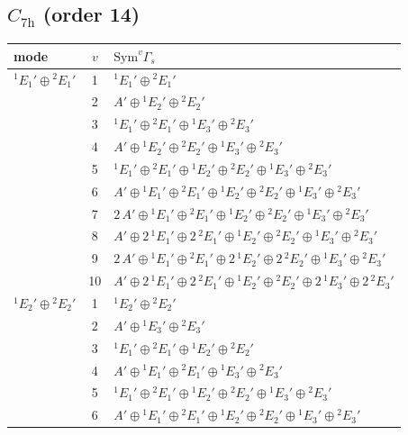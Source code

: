 \documentclass[11pt]{article}
\begin{document}
\subsection*{$C_{7\mathrm{h}}$ \quad (order 14)}
\begin{longtable}{l c p{}}
\hline mode & $v$ & $\mathrm{Sym}^v\Gamma_s$\\ \hline\endhead
${}^{1}E_{1}'\oplus {}^{2}E_{1}'$ & 1 & ${}^{1}E_{1}'\oplus {}^{2}E_{1}'$\\
 & 2 & $A'\oplus {}^{1}E_{2}'\oplus {}^{2}E_{2}'$\\
 & 3 & ${}^{1}E_{1}'\oplus {}^{2}E_{1}'\oplus {}^{1}E_{3}'\oplus {}^{2}E_{3}'$\\
 & 4 & $A'\oplus {}^{1}E_{2}'\oplus {}^{2}E_{2}'\oplus {}^{1}E_{3}'\oplus {}^{2}E_{3}'$\\
 & 5 & ${}^{1}E_{1}'\oplus {}^{2}E_{1}'\oplus {}^{1}E_{2}'\oplus {}^{2}E_{2}'\oplus {}^{1}E_{3}'\oplus {}^{2}E_{3}'$\\
 & 6 & $A'\oplus {}^{1}E_{1}'\oplus {}^{2}E_{1}'\oplus {}^{1}E_{2}'\oplus {}^{2}E_{2}'\oplus {}^{1}E_{3}'\oplus {}^{2}E_{3}'$\\
 & 7 & $2\,A'\oplus {}^{1}E_{1}'\oplus {}^{2}E_{1}'\oplus {}^{1}E_{2}'\oplus {}^{2}E_{2}'\oplus {}^{1}E_{3}'\oplus {}^{2}E_{3}'$\\
 & 8 & $A'\oplus 2\,{}^{1}E_{1}'\oplus 2\,{}^{2}E_{1}'\oplus {}^{1}E_{2}'\oplus {}^{2}E_{2}'\oplus {}^{1}E_{3}'\oplus {}^{2}E_{3}'$\\
 & 9 & $2\,A'\oplus {}^{1}E_{1}'\oplus {}^{2}E_{1}'\oplus 2\,{}^{1}E_{2}'\oplus 2\,{}^{2}E_{2}'\oplus {}^{1}E_{3}'\oplus {}^{2}E_{3}'$\\
 & 10 & $A'\oplus 2\,{}^{1}E_{1}'\oplus 2\,{}^{2}E_{1}'\oplus {}^{1}E_{2}'\oplus {}^{2}E_{2}'\oplus 2\,{}^{1}E_{3}'\oplus 2\,{}^{2}E_{3}'$\\
\hline
${}^{1}E_{2}'\oplus {}^{2}E_{2}'$ & 1 & ${}^{1}E_{2}'\oplus {}^{2}E_{2}'$\\
 & 2 & $A'\oplus {}^{1}E_{3}'\oplus {}^{2}E_{3}'$\\
 & 3 & ${}^{1}E_{1}'\oplus {}^{2}E_{1}'\oplus {}^{1}E_{2}'\oplus {}^{2}E_{2}'$\\
 & 4 & $A'\oplus {}^{1}E_{1}'\oplus {}^{2}E_{1}'\oplus {}^{1}E_{3}'\oplus {}^{2}E_{3}'$\\
 & 5 & ${}^{1}E_{1}'\oplus {}^{2}E_{1}'\oplus {}^{1}E_{2}'\oplus {}^{2}E_{2}'\oplus {}^{1}E_{3}'\oplus {}^{2}E_{3}'$\\
 & 6 & $A'\oplus {}^{1}E_{1}'\oplus {}^{2}E_{1}'\oplus {}^{1}E_{2}'\oplus {}^{2}E_{2}'\oplus {}^{1}E_{3}'\oplus {}^{2}E_{3}'$\\

\end{longtable}
\end{document}
